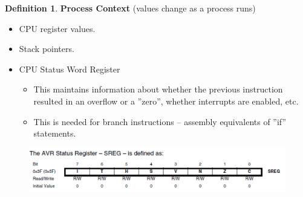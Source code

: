 \documentclass[12pt,a4paper]{article}
\theoremstyle{definition}
\newtheorem{definition}{Definition}[section]
\newenvironment{myitemize}
{ \begin{itemize}
    \setlength{\itemsep}{5pt}
    \setlength{\parskip}{0pt}
    \setlength{\parsep}{0pt}     }
{ \end{itemize}                  }
\begin{document}
\begin{definition}{\textbf{Process Context}} (values change as a process runs)
	\begin{myitemize}
		\item CPU register values. 
		\item Stack pointers.
		\item CPU Status Word Register
		\begin{myitemize}
			\item This maintains information about whether the previous instruction resulted in an overflow or a ''zero'', whether interrupts are enabled, etc.
			\item This is needed for branch instructions – assembly equivalents of ''if'' statements.
		\end{myitemize}
	\end{myitemize}
\end{definition}

\begin{figure}[h!]
	\includegraphics[scale=0.6]{m1/statusRegister}
	\centering
\end{figure}
\end{document}
